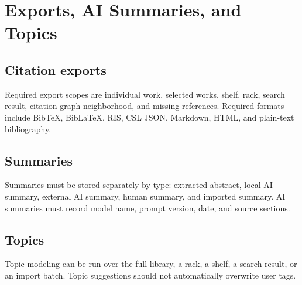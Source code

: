 \section{Exports, AI Summaries, and Topics}

\subsection{Citation exports}

Required export scopes are individual work, selected works, shelf, rack, search result, citation graph neighborhood, and missing references. Required formats include BibTeX, BibLaTeX, RIS, CSL JSON, Markdown, HTML, and plain-text bibliography.

\subsection{Summaries}

Summaries must be stored separately by type: extracted abstract, local AI summary, external AI summary, human summary, and imported summary. AI summaries must record model name, prompt version, date, and source sections.

\subsection{Topics}

Topic modeling can be run over the full library, a rack, a shelf, a search result, or an import batch. Topic suggestions should not automatically overwrite user tags.
